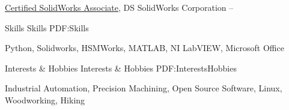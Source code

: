 \documentclass[letterpaper,MMMyyyy,nonstopmode]{resume}
\begin{document}
\begin{Body}
\BulletItem
\href{http://www.solidworks.com/sw/support/mcad-certification-programs.htm}
{Certified SolidWorks Associate},
DS SolidWorks Corporation
\hfill
{} --



\Section
{Skills}
{Skills}
{PDF:Skills}

\Entry
Python,
Solidworks,
HSMWorks,
MATLAB,
NI LabVIEW,
Microsoft Office



\Section
{Interests \& Hobbies}
{Interests \& Hobbies}
{PDF:InterestsHobbies}

\Entry
Industrial Automation,
Precision Machining,
Open Source Software,
Linux, Woodworking, Hiking

\end{Body}
\end{document}
